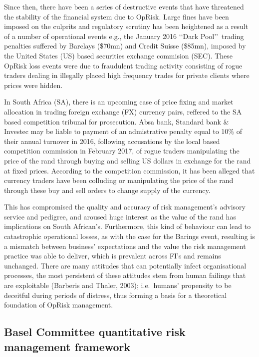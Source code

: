 \documentclass[]{DissertateUSU}
\begin{document}
Since then, there have been a series of destructive events that have
threatened the stability of the financial system due to OpRisk. Large
fines have been imposed on the culprits and regulatory scrutiny has been
heightened as a result of a number of operational events e.g., the
January 2016 \lq\lq Dark Pool\rq\rq~trading penalties suffered by
Barclays (\$70mn) and Credit Suisse (\$85mn), imposed by the United
States (US) based securities exchange commision (SEC). These OpRisk loss
events were due to fraudulent trading activity consisting of rogue
traders dealing in illegally placed high frequency trades for private
clients where prices were hidden.\medskip 

In South Africa (SA), there is an upcoming case of price fixing and
market allocation in trading foreign exchange (FX) currency pairs,
reffered to the SA based competition tribunal for prosecution. Absa
bank, Standard bank \& Investec may be liable to payment of an
admistrative penalty equal to 10\% of their annual turnover in 2016,
following accusations by the local based competition commission in
February 2017, of rogue traders manipulating the price of the rand
through buying and selling US dollars in exchange for the rand at fixed
prices. According to the competition commission, it has been alleged
that currency traders have been colluding or manipulating the price of
the rand through these buy and sell orders to change supply of the
currency.\medskip

This has compromised the quality and accuracy of risk management's
advisory service and pedigree, and aroused huge interest as the value of
the rand has implications on South African's. Furthermore, this kind of
behaviour can lead to catastrophic operational losses, as with the case
for the Barings event, resulting is a mismatch between business'
expectations and the value the risk management practice was able to
deliver, which is prevalent across FI's and remains unchanged. There are
many attitudes that can potentially infect organisational processes, the
most persistent of these attitudes stem from human failings that are
exploitable (Barberis and Thaler, 2003); i.e.~humans' propensity to be
deceitful during periods of distress, thus forming a basis for a
theoretical foundation of OpRisk management.\medskip

\subsection{Basel Committee quantitative risk management framework}
\end{document}
